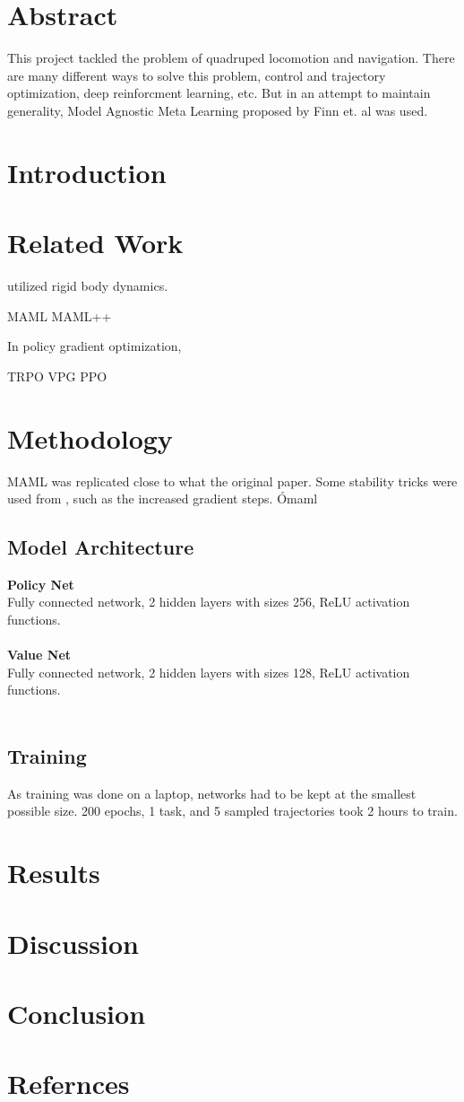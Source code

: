 \documentclass{article}
\theoremstyle{definition}
\theoremstyle{note}
\begin{document}
\section{Abstract}
This project tackled the problem of quadruped locomotion and navigation.
There are many different ways to solve this problem, control and trajectory
optimization, deep reinforcment learning, etc. 
But in an attempt to maintain generality, Model Agnostic Meta Learning
proposed by Finn et. al\cite{finn} was used. 

\section{Introduction}

\section{Related Work}
\cite{winkler} utilized rigid body dynamics. 


MAML 
MAML++

In policy gradient optimization, \cite{trpo} 

TRPO
VPG
PPO




\section{Methodology}
MAML was replicated close to what the original paper.
Some stability tricks were used from \cite{maml++}, 
such as the increased gradient steps. 
Ómaml


\subsection{Model Architecture}
\textbf{Policy Net}\\
Fully connected network, 2 hidden layers with sizes 256, ReLU 
activation functions.\\\\
\textbf{Value Net}\\
Fully connected network, 2 hidden layers with sizes 128, ReLU 
activation functions.\\\\
\subsection{Training}
As training was done on a laptop, networks had to be kept at the smallest possible size. 200 epochs, 1 task, and 5 sampled trajectories took 2 hours to train.



\section{Results}
\section{Discussion}
\section{Conclusion}
\section{Refernces}
\end{document}
